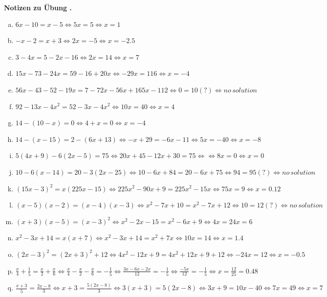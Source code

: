 \documentclass[%
11pt,%
twoside,%
titlepage,%
swissgerman,%
headsepline%
]{scrartcl}
\newcommand{\faReturnGray}{\textcolor{gray}{\faMailReply}} %
\theoremstyle{definition}
\theoremstyle{plain}
\newcommand{\concatueb}[1]{ueb:#1}%
\newcommand{\concatlsg}[1]{lsg:#1}%
\newcounter{uebcounter}[section]
\renewcommand{\theuebcounter}{\thesection.\arabic{uebcounter}}  %
\newenvironment{lsg}[1]{%
    \par\noindent\textbf{Notizen zu Übung \theuebcounter\label{\concatlsg{#1}}}
    \hfill\hyperref[\concatueb{#1}]{\faReturnGray}\par %
}{%
    \par%
}
\begin{document}
\begin{lsg}{lineareglagogo}
    \begin{enumerate}[a)]
        \item $6x-10=x-5 \Leftrightarrow 5x=5 \Leftrightarrow x={1}$
        \item $-x-2=x+3 \Leftrightarrow 2x=-5 \Leftrightarrow x={-2.5}$
        \item $3-4x=5-2x-16 \Leftrightarrow 2x=14 \Leftrightarrow x={7}$
        \item $15x-73-24x=59-16+20x  \Leftrightarrow -29x=116  \Leftrightarrow x={-4}$
        \item $56x-43-52-19x=7-72x-56x+165x-112  \Leftrightarrow 0 = 10 (?)\Leftrightarrow {no\, solution}$
        \item $92-13x-4x^2=52-3x-4x^2 \Leftrightarrow 10x=40\Leftrightarrow x={4}$
        \item $14-(10-x)=0 \Leftrightarrow 4+x=0 \Leftrightarrow x={-4} $
        \item $14-(x-15)=2-(6x+13) \Leftrightarrow -x+29= -6x-11 \Leftrightarrow 5x = -40 \Leftrightarrow x={-8}$
        \item $5(4x+9)-6(2x-5)=75 \Leftrightarrow 20x+45 -12x+30 = 75 \Leftrightarrow \Leftrightarrow 8x=0 \Leftrightarrow x={0}$
        \item $10-6(x-14)=20-3(2x-25) \Leftrightarrow 10-6x+84 = 20-6x+75 \Leftrightarrow 94=95(?) \Leftrightarrow {no \, solution}$
        \item $(15x-3)^2=x(225x-15) \Leftrightarrow 225x^2-90x+9 = 225x^2-15x \Leftrightarrow 75x = 9 \Leftrightarrow x={0.12}$
        \item $(x-5)(x-2)=(x-4)(x-3)\Leftrightarrow x^2-7x+10 = x^2-7x+12 \Leftrightarrow 10=12(?) \Leftrightarrow {no \, solution}$
        \item $(x+3)(x-5)=(x-3)^2\Leftrightarrow x^2-2x-15 = x^2-6x+9 \Leftrightarrow 4x=24  x={6}$
        \item $x^2-3x+14=x(x+7)\Leftrightarrow x^2-3x+14=x^2+7x \Leftrightarrow 10x=14 \Leftrightarrow x={1.4}$
        \item $(2x-3)^2=(2x+3)^2+12\Leftrightarrow 4x^2 -12x+9 = 4x^2+12x+9+12\Leftrightarrow -24x=12 \Leftrightarrow x={-0.5}$
        \item $\frac{x}{4}+\frac{1}{5}=\frac{x}{2}+\frac{x}{6}\Leftrightarrow \frac{x}{4}-\frac{x}{2}-\frac{x}{6} = -\frac{1}{5} \Leftrightarrow  \frac{3x-6x-2x}{12}=-\frac{1}{5} \Leftrightarrow \frac{-5x}{12}=-\frac{1}{5}\Leftrightarrow x=\frac{12}{25}={0.48}$
        \item $\frac{x+3}{5}=\frac{2x-8}{3}\Leftrightarrow x+3 = \frac{5(2x-8)}{3}\Leftrightarrow 3(x+3)=5(2x-8) \Leftrightarrow 3x+9=10x-40 \Leftrightarrow 7x=49 \Leftrightarrow x={7}$

\end{enumerate}
\end{lsg}
\end{document}
